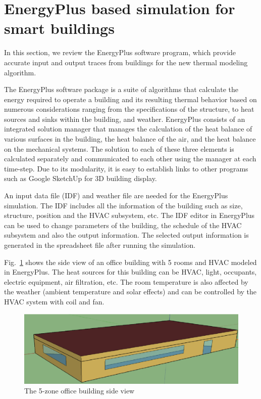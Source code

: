 \section{EnergyPlus based simulation for smart buildings}

In this section, we review the EnergyPlus software program, which provide
accurate input and output traces from buildings for the new thermal
modeling algorithm.

The EnergyPlus software package is a suite of
algorithms that calculate the energy required to operate a building
and its resulting thermal behavior based on numerous considerations
ranging from the specifications of the structure, to heat sources and
sinks within the building, and weather. EnergyPlus consists of  an integrated solution
manager that manages the calculation of the heat balance of various
surfaces in the building, the heat balance of the air, and the heat
balance on the mechanical systems. The solution to each of these three
elements is calculated separately and communicated to each other
using the manager at each time-step.
Due to its modularity, it is easy to establish links to other programs such as Google SketchUp for 3D building display.

An input data file (IDF) and weather file are needed for the EnergyPlus
simulation. The IDF includes all the information of the building such
as size, structure, position and the HVAC subsystem, etc. The IDF
editor in EnergyPlus can be used to change parameters of the building, the
schedule of the HVAC subsystem and also the output information. The
selected output information is generated in the spreadsheet file
after running the simulation.

Fig.~\ref{fig:5zone} shows the side view of an office building
with 5 rooms and HVAC modeled in EnergyPlus. The heat sources for this building
can be HVAC, light, occupants, electric equipment, air filtration, etc. The
room temperature is also affected by the weather (ambient temperature and solar
effects) and can be controlled by the HVAC system with coil
and fan.

\begin{figure}[t]
    \centering
    \includegraphics[width=0.7\columnwidth]{figs/energyplus_review/5zone-a}
    \caption{The 5-zone office building side view}
    \label{fig:5zone}
\end{figure}

